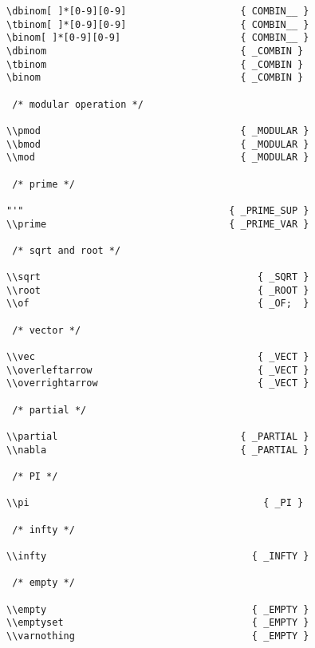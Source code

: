 \begin{verbatim}
\dbinom[ ]*[0-9][0-9]                    { COMBIN__ }
\tbinom[ ]*[0-9][0-9]                    { COMBIN__ } 
\binom[ ]*[0-9][0-9]                     { COMBIN__ } 
\dbinom                                  { _COMBIN }
\tbinom                                  { _COMBIN }
\binom                                   { _COMBIN }

 /* modular operation */

\\pmod                                   { _MODULAR } 
\\bmod                                   { _MODULAR } 
\\mod                                    { _MODULAR } 

 /* prime */

"'"                                    { _PRIME_SUP }
\\prime                                { _PRIME_VAR } 

 /* sqrt and root */

\\sqrt                                      { _SQRT }
\\root                                      { _ROOT }
\\of                                        { _OF;  }

 /* vector */
 
\\vec                                       { _VECT }
\\overleftarrow                             { _VECT }
\\overrightarrow                            { _VECT }

 /* partial */
 
\\partial                                { _PARTIAL } 
\\nabla                                  { _PARTIAL } 

 /* PI */

\\pi                                         { _PI } 

 /* infty */

\\infty                                    { _INFTY }

 /* empty */

\\empty                                    { _EMPTY }
\\emptyset                                 { _EMPTY }
\\varnothing                               { _EMPTY }


\end{verbatim}
